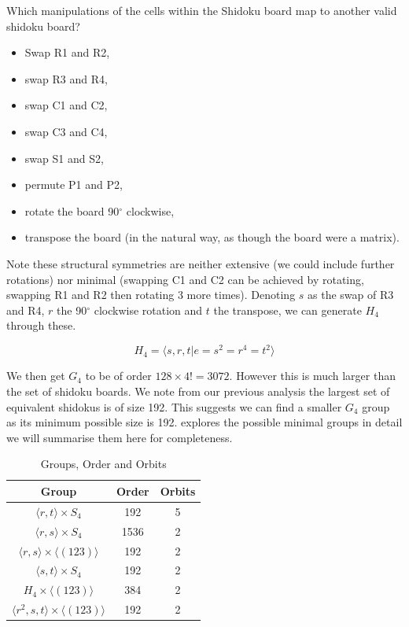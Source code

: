 \documentclass[a4paper,11pt]{report}
\begin{document}
Which manipulations of the cells within the Shidoku board map to another valid shidoku board? 
\begin{itemize}
\item Swap R1 and R2,
\item swap R3 and R4,
\item swap C1 and C2,
\item swap C3 and C4,
\item swap S1 and S2,
\item permute P1 and P2,
\item rotate the board 90$^\circ$ clockwise,
\item transpose the board (in the natural way, as though the board were a matrix).
\end{itemize}
Note these structural symmetries are neither extensive (we could include further rotations) nor minimal (swapping C1 and C2 can be achieved by rotating, swapping R1 and R2 then rotating 3 more times). Denoting $s$ as the swap of R3 and R4, $r$ the 90$^\circ$ clockwise rotation and $t$ the transpose, we can generate $H_4$ through these.

\begin{equation}H_4 = \langle s,r,t | e=s^2=r^4=t^2\rangle\end{equation}

We then get $G_4$ to be of order $128\times 4!=3072$. However this is much larger than the set of shidoku boards. We note from our previous analysis the largest set of equivalent shidokus is of size 192. This suggests we can find a smaller $G_4$ group as its minimum possible size is 192. \cite{} explores the possible minimal groups in detail we will summarise them here for completeness.

\begin{table}
\begin{center}
\begin{tabular}{ |c|c|c|  }
 \hline
Group & Order & Orbits\\
 \hline
 $\langle r,t \rangle \times S_4$ & 192 & 5\\
 $\langle r,s \rangle \times S_4$ & 1536 & 2\\
 $\langle r,s \rangle \times \langle (123)\rangle$ & 192 & 2\\
 $\langle s,t \rangle \times S_4$ & 192 & 2\\
 $H_4 \times\langle (123) \rangle $ & 384 & 2\\
 $\langle r^2,s,t \rangle \times \langle (123) \rangle$ & 192 & 2\\
 \hline
\end{tabular}
\end{center}
\caption{\label{table:group}Groups, Order and Orbits}
\end{table}
\end{document}

